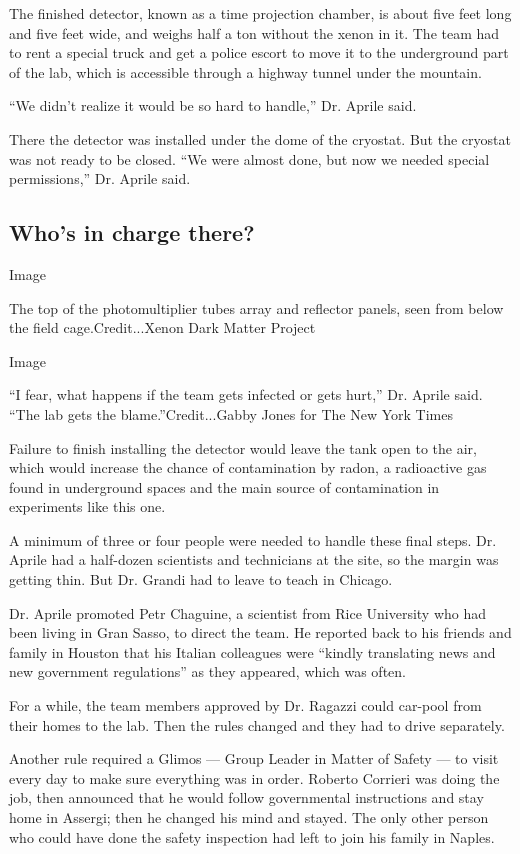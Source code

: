 The finished detector, known as a time projection chamber, is about five
feet long and five feet wide, and weighs half a ton without the xenon in
it. The team had to rent a special truck and get a police escort to move
it to the underground part of the lab, which is accessible through a
highway tunnel under the mountain.

``We didn't realize it would be so hard to handle,'' Dr. Aprile said.

There the detector was installed under the dome of the cryostat. But the
cryostat was not ready to be closed. ``We were almost done, but now we
needed special permissions,'' Dr. Aprile said.

\hypertarget{whos-in-charge-there}{%
\subsection{Who's in charge there?}\label{whos-in-charge-there}}

Image

The top of the photomultiplier tubes array and reflector panels, seen
from below the field cage.Credit...Xenon Dark Matter Project

Image

``I fear, what happens if the team gets infected or gets hurt,'' Dr.
Aprile said. ``The lab gets the blame.''Credit...Gabby Jones for The New
York Times

Failure to finish installing the detector would leave the tank open to
the air, which would increase the chance of contamination by radon, a
radioactive gas found in underground spaces and the main source of
contamination in experiments like this one.

A minimum of three or four people were needed to handle these final
steps. Dr. Aprile had a half-dozen scientists and technicians at the
site, so the margin was getting thin. But Dr. Grandi had to leave to
teach in Chicago.

Dr. Aprile promoted Petr Chaguine, a scientist from Rice University who
had been living in Gran Sasso, to direct the team. He reported back to
his friends and family in Houston that his Italian colleagues were
``kindly translating news and new government regulations'' as they
appeared, which was often.

For a while, the team members approved by Dr. Ragazzi could car-pool
from their homes to the lab. Then the rules changed and they had to
drive separately.

Another rule required a Glimos --- Group Leader in Matter of Safety ---
to visit every day to make sure everything was in order. Roberto
Corrieri was doing the job, then announced that he would follow
governmental instructions and stay home in Assergi; then he changed his
mind and stayed. The only other person who could have done the safety
inspection had left to join his family in Naples.

